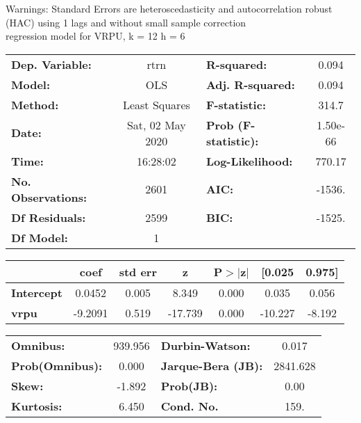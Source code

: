 Warnings: \newline
 [1] Standard Errors are heteroscedasticity and autocorrelation robust (HAC) using 1 lags and without small sample correction\\ 

regression model for VRPU, k = 12 h = 6\begin{center}
\begin{tabular}{lclc}
\toprule
\textbf{Dep. Variable:}    &       rtrn       & \textbf{  R-squared:         } &     0.094   \\
\textbf{Model:}            &       OLS        & \textbf{  Adj. R-squared:    } &     0.094   \\
\textbf{Method:}           &  Least Squares   & \textbf{  F-statistic:       } &     314.7   \\
\textbf{Date:}             & Sat, 02 May 2020 & \textbf{  Prob (F-statistic):} &  1.50e-66   \\
\textbf{Time:}             &     16:28:02     & \textbf{  Log-Likelihood:    } &    770.17   \\
\textbf{No. Observations:} &        2601      & \textbf{  AIC:               } &    -1536.   \\
\textbf{Df Residuals:}     &        2599      & \textbf{  BIC:               } &    -1525.   \\
\textbf{Df Model:}         &           1      & \textbf{                     } &             \\
\bottomrule
\end{tabular}
\begin{tabular}{lcccccc}
                   & \textbf{coef} & \textbf{std err} & \textbf{z} & \textbf{P$> |$z$|$} & \textbf{[0.025} & \textbf{0.975]}  \\
\midrule
\textbf{Intercept} &       0.0452  &        0.005     &     8.349  &         0.000        &        0.035    &        0.056     \\
\textbf{vrpu}      &      -9.2091  &        0.519     &   -17.739  &         0.000        &      -10.227    &       -8.192     \\
\bottomrule
\end{tabular}
\begin{tabular}{lclc}
\textbf{Omnibus:}       & 939.956 & \textbf{  Durbin-Watson:     } &    0.017  \\
\textbf{Prob(Omnibus):} &   0.000 & \textbf{  Jarque-Bera (JB):  } & 2841.628  \\
\textbf{Skew:}          &  -1.892 & \textbf{  Prob(JB):          } &     0.00  \\
\textbf{Kurtosis:}      &   6.450 & \textbf{  Cond. No.          } &     159.  \\
\bottomrule
\end{tabular}
\end{center}

